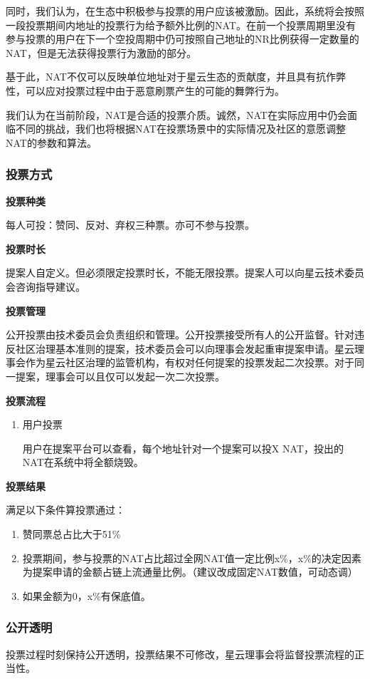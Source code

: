 同时，我们认为，在生态中积极参与投票的用户应该被激励。因此，系统将会按照一段投票期间内地址的投票行为给予额外比例的NAT。在前一个投票周期里没有参与投票的用户在下一个空投周期中仍可按照自己地址的NR比例获得一定数量的NAT，但是无法获得投票行为激励的部分。

基于此，NAT不仅可以反映单位地址对于星云生态的贡献度，并且具有抗作弊性，可以应对投票过程中由于恶意刷票产生的可能的舞弊行为。

我们认为在当前阶段，NAT是合适的投票介质。诚然，NAT在实际应用中仍会面临不同的挑战，我们也将根据NAT在投票场景中的实际情况及社区的意愿调整NAT的参数和算法。

\subsubsection{投票方式}
\textbf{投票种类}

每人可投：赞同、反对、弃权三种票。亦可不参与投票。

\textbf{投票时长}

提案人自定义。但必须限定投票时长，不能无限投票。提案人可以向星云技术委员会咨询指导建议。

\textbf{投票管理}

公开投票由技术委员会负责组织和管理。公开投票接受所有人的公开监督。针对违反社区治理基本准则的提案，技术委员会可以向理事会发起重审提案申请。星云理事会作为星云社区治理的监管机构，有权对任何提案的投票发起二次投票。对于同一提案，理事会可以且仅可以发起一次二次投票。

\textbf{投票流程}
\begin{enumerate}

\item 用户投票

用户在提案平台可以查看，每个地址针对一个提案可以投X NAT，投出的NAT在系统中将全额烧毁。

\end{enumerate}

\textbf{投票结果}

满足以下条件算投票通过：

\begin{enumerate}
\item 赞同票总占比大于51\%
\item 投票期间，参与投票的NAT占比超过全网NAT值一定比例x\%，x\%的决定因素为提案申请的金额占链上流通量比例。{\color{red}（建议改成固定NAT数值，可动态调）}
\item 如果金额为0，x\%有保底值。
\end{enumerate}

\subsubsection{公开透明}
投票过程时刻保持公开透明，投票结果不可修改，星云理事会将监督投票流程的正当性。

